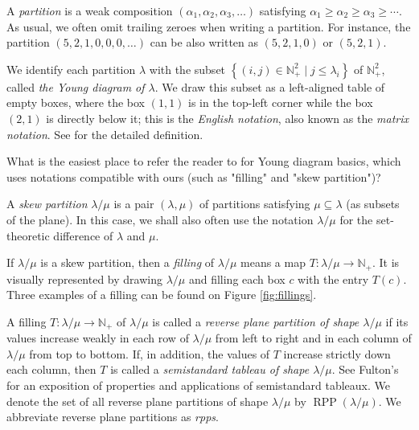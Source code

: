 \documentclass[numbers=enddot,12pt,final,onecolumn,notitlepage]{scrartcl}%
\theoremstyle{definition}
\newenvironment{todo}{}{}
\newcommand{\Nplus}{\mathbb{N}_{+}}
\def\lm{{\lambda/\mu}}
\begin{document}
A \textit{partition} is a weak composition $\left(  \alpha_{1},\alpha
_{2},\alpha_{3},\ldots\right)  $ satisfying $\alpha_{1}\geq\alpha_{2}
\geq\alpha_{3}\geq\cdots$.
As usual, we often omit trailing zeroes when writing a partition. For instance, the partition $(5,2,1,0,0,0,\ldots)$ can be also written as $(5,2,1,0)$ or $(5,2,1)$.

We identify each partition $\lambda$ with the subset
$\left\{ \left( i, j \right) \in \Nplus^2 \mid j \leq \lambda_i \right\}$
of $\Nplus^{2}$, called \textit{the Young diagram of $\lambda$}.
We draw this subset as a left-aligned table of
empty boxes, where the box $(1,1)$ is in the top-left corner while the
box $(2,1)$ is directly below it; this is the \textit{English notation},
also known as the \textit{matrix notation}. See \cite{Fulton97} for the detailed definition.


\begin{todo}
What is the easiest place to refer the reader to for Young diagram basics,
which uses notations compatible with ours (such as "filling" and "skew
partition")?
\end{todo}

A \textit{skew partition} $\lambda/\mu$ is a pair $\left(\lambda, \mu\right)$ of partitions satisfying $\mu\subseteq\lambda$ (as subsets of the plane). In this case, we shall also often use the notation $\lambda/\mu$ for the set-theoretic difference of $\lambda$ and $\mu$.

 If $\lm$ is a skew partition, then a \textit{filling} of $\lm$ means a map $T:\lm\rightarrow\Nplus$. It is visually represented by drawing $\lm$ and filling each box $c$ with the entry $T(c)$. Three examples of a filling can be found on Figure \ref{fig:fillings}.
 

 A filling $T:\lm\rightarrow\Nplus$ of $\lm$ is called a \textit{reverse plane partition of shape $\lm$} if its values increase weakly in each row of $\lm$ from left to right and in each column of $\lm$ from top to bottom. If, in addition, the values of $T$ increase strictly down each column, then $T$ is called a \textit{semistandard tableau of shape $\lm$}. See Fulton's \cite{Fulton97} for an exposition of properties and applications of semistandard tableaux.
 We denote the set of all reverse plane partitions of shape $\lm$ by $\operatorname{RPP}\left(  \lambda/\mu\right)$.  We abbreviate reverse plane partitions as \textit{rpps}. 
 
\end{document}
